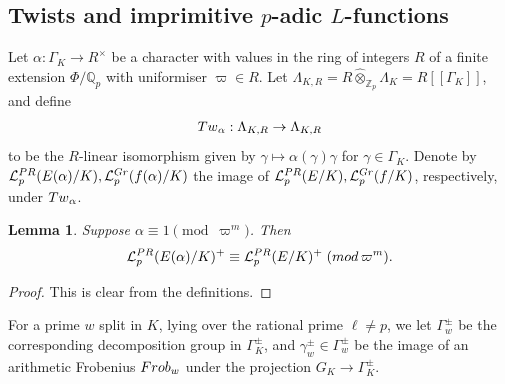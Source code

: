 \documentclass[a4paper,10pt]{amsart}
\numberwithin{equation}{section}
\numberwithin{equation}{section}
\theoremstyle{plain}
\theoremstyle{definition}
\theoremstyle{definition}
\theoremstyle{plain}
\theoremstyle{plain}
\newtheorem{lemma}[thm]{Lemma}
\theoremstyle{plain}
\theoremstyle{plain}
\newcommand{\Z}{\mathbb{Z}}
\newcommand{\Q}{\mathbb{Q}}
\newcommand{\Lcal}{\mathcal{L}}
\begin{document}
\subsection{Twists and imprimitive $p$-adic $L$-functions}\label{subsec:tw-L}


Let $\alpha:\Gamma_K\rightarrow R^\times$ be a character with values in the ring of integers $R$ of a finite extension $\Phi/\Q_p$ with uniformiser $\varpi\in R$. Let $\Lambda_{K,R} = R\widehat\otimes_{\Z_p}\Lambda_K = R[\![\Gamma_K]\!]$, and define
\[
{\rm Tw}_\alpha:\Lambda_{K,R}\rightarrow\Lambda_{K,R}
\]
to be the $R$-linear isomorphism given by $\gamma\mapsto\alpha(\gamma)\gamma$ for $\gamma\in\Gamma_K$. Denote by 
$\Lcal_p^{\rm PR}(E(\alpha)/K), \Lcal_p^{\rm Gr}(f(\alpha)/K)$ the image of $\Lcal_p^{\rm PR}(E/K), \Lcal_p^{\rm Gr}(f/K)$, respectively, under ${\rm Tw}_\alpha$. %

\begin{lemma}\label{lem:cong-L}
Suppose $\alpha\equiv 1\pmod{\varpi^m}$. Then 
\[
\Lcal_p^{\rm PR}(E(\alpha)/K)^+\equiv\Lcal_p^{\rm PR}(E/K)^+\;({\rm mod}\,\varpi^m).
\]
\end{lemma}

\begin{proof}
This is clear from the definitions.
%
\end{proof}



For a prime $w$ split in $K$, lying over the rational prime $\ell\neq p$, we let $\Gamma_w^\pm$ be the corresponding decomposition group in $\Gamma_K^\pm$, and $\gamma_w^\pm\in\Gamma_w^\pm$ be the image of an arithmetic Frobenius ${\rm Frob}_w$ under the projection $G_K\rightarrow\Gamma_K^\pm$. 
\end{document}
